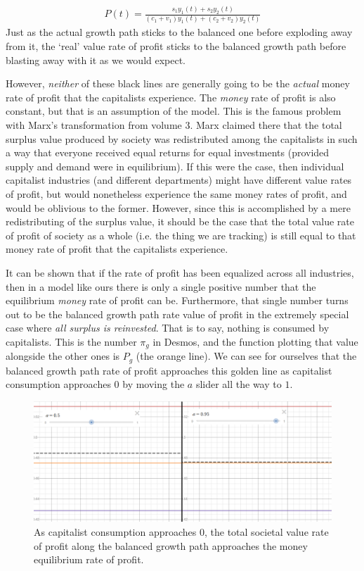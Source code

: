 \documentclass{article}
\theoremstyle{theorem}
\begin{document}
\begin{align}
	P(t) = \frac{s_1 y_1(t) + s_2y_2(t)}{(c_1+v_1)y_1(t) + (c_2+v_2)y_2(t)}
\end{align}
 Just as the actual growth path sticks to the balanced one before exploding away from it, the `real' value rate of profit sticks to the balanced growth path before blasting away with it as we would expect. \par 
However, \emph{neither} of these black lines are generally going to be the \emph{actual} money rate of profit that the capitalists experience. The \emph{money} rate of profit is also constant, but that is an assumption of the model. This is the famous problem with Marx's transformation from volume $3$. Marx claimed there that the total surplus value produced by society was redistributed among the capitalists in such a way that everyone received equal returns for equal investments (provided supply and demand were in equilibrium). If this were the case, then individual capitalist industries (and different departments) might have different value rates of profit, but would nonetheless experience the same money rates of profit, and would be oblivious to the former. However, since this is accomplished by a mere redistributing of the surplus value, it should be the case that the total value rate of profit of society as a whole (i.e. the thing we are tracking) is still equal to that money rate of profit that the capitalists experience. \par 
It can be shown that if the rate of profit has been equalized across all industries, then in a model like ours there is only a single positive number that the equilibrium \emph{money} rate of profit can be. Furthermore, that single number turns out to be the balanced growth path rate value of profit in the extremely special case where \emph{all surplus is reinvested}. That is to say, nothing is consumed by capitalists. This is the number $\pi_g$ in Desmos, and the function plotting that value alongside the other ones is $P_g$ (the orange line). We can see for ourselves that the balanced growth path rate of profit approaches this golden line as capitalist consumption approaches $0$ by moving the $a$ slider all the way to $1$. 
\begin{figure}[H]
\centering
\includegraphics[scale=.5]{Images/approachingGolden}
\caption{As capitalist consumption approaches $0$, the total societal value rate of profit along the balanced growth path approaches the money equilibrium rate of profit.}
\end{figure}
\end{document}
